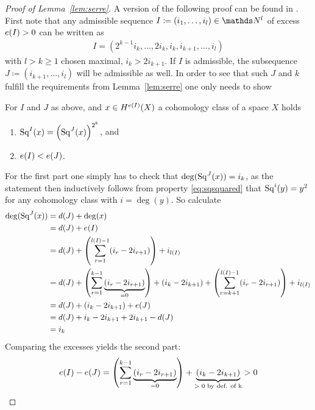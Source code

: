\begin{proof}[Proof of Lemma~\ref{lem:serre}]
  A version of the following proof can be found in
  \cite[p.~159, Lemma~1, converse part]{serre}.
  First note that any admissible sequence $I\coloneqq(i_1,\dotsc,i_l)\in\Nat^l$
  of excess $e(I)>0$ can be written as
  \begin{gather*}
    I=(2^{k-1}i_k,\dotsc,2i_k,i_k,i_{k+1},\dotsc,i_l)
  \end{gather*}
  with $l>k\geq 1$ chosen maximal, \idest $i_k>2i_{k+1}$. If $I$ is admissible, the subsequence
  $J\coloneqq(i_{k+1},\dotsc,i_l)$ will be admissible as well.
  In order to see that such $J$ and $k$ fulfill the requirements from
  Lemma~\ref{lem:serre} one only needs to show
  \begin{claim}
    For $I$ and $J$ as above, and $x\in H^{e(I)}(X)$ a cohomology
    class of a space $X$ holds
    \begin{enumerate}
    \item $\mathrm{Sq}^{I}(x) = \left(\mathrm{Sq}^{J}(x)\right)^{2^k}$, and
    \item $e(I)<e(J)$.
    \end{enumerate}
  \end{claim}
  For the first part one simply has to check that
  $\deg(\mathrm{Sq}^{J}(x))=i_k$, as the statement then inductively follows from
  property \eqref{eq:sqsquared} that $\mathrm{Sq}^{i}(y)=y^2$ for any cohomology
  class with $i=\deg(y)$.
  So calculate
  \begin{align*}
    \deg(\mathrm{Sq}^{J}(x))
    &= d(J) + \deg(x)\\
    &= d(J) + e(I)\\
    &= d(J) 
      + \left(\sum_{r=1}^{l(I)-1}(i_r-2i_{r+1})\right)
      + i_{l(I)}\\
    &= d(J)
      + \left(\sum_{r=1}^{k-1}\underbrace{(i_r-2i_{r+1})}_{=0}\right)
      + (i_k-2i_{k+1})
      +\left(\sum_{r=k+1}^{l(I)-1}(i_r-2i_{r+1})\right) + i_{l(I)}\\
    &= d(J)
      + (i_k-2i_{k+1})
      + e(J) \\
    &= d(J) + i_k - 2i_{k+1} + 2i_{k+1} - d(J) \\
    &= i_k
  \end{align*}
  Comparing the excesses yields the second part:
  \begin{gather*}
    e(I) - e(J)
    = \left(\sum_{r=1}^{k-1}\underbrace{(i_r-2i_{r+1})}_{=0}\right)
    + \underbrace{(i_k - 2i_{k+1})}_{\text{$>0$ by def. of k}}
    > 0
    \qedhere
  \end{gather*}
\end{proof}


